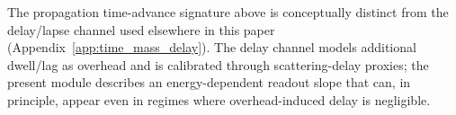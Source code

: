 \begin{remark}
\AuditTag The propagation time-advance signature above is conceptually distinct from the delay/lapse channel used elsewhere in this paper (Appendix~\ref{app:time_mass_delay}).
The delay channel models additional dwell/lag as overhead and is calibrated through scattering-delay proxies; the present module describes an energy-dependent readout slope that can, in principle, appear even in regimes where overhead-induced delay is negligible.
\end{remark}

